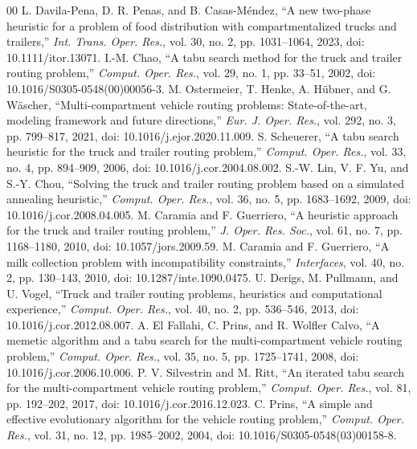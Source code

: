 \documentclass[conference]{IEEEtran}
\begin{document}
\begin{thebibliography}{00}
\setlength{\itemsep}{0pt}
 L. Davila-Pena, D. R. Penas, and B. Casas-M\'endez, ``A new two-phase heuristic for a problem of food distribution with compartmentalized trucks and trailers,'' \textit{Int. Trans. Oper. Res.}, vol. 30, no. 2, pp. 1031--1064, 2023, doi: 10.1111/itor.13071.
 I.-M. Chao, ``A tabu search method for the truck and trailer routing problem,'' \textit{Comput. Oper. Res.}, vol. 29, no. 1, pp. 33--51, 2002, doi: 10.1016/S0305-0548(00)00056-3.
 M. Ostermeier, T. Henke, A. H\"ubner, and G. W\"ascher, ``Multi-compartment vehicle routing problems: State-of-the-art, modeling framework and future directions,'' \textit{Eur. J. Oper. Res.}, vol. 292, no. 3, pp. 799--817, 2021, doi: 10.1016/j.ejor.2020.11.009.
 S. Scheuerer, ``A tabu search heuristic for the truck and trailer routing problem,'' \textit{Comput. Oper. Res.}, vol. 33, no. 4, pp. 894--909, 2006, doi: 10.1016/j.cor.2004.08.002.
 S.-W. Lin, V. F. Yu, and S.-Y. Chou, ``Solving the truck and trailer routing problem based on a simulated annealing heuristic,'' \textit{Comput. Oper. Res.}, vol. 36, no. 5, pp. 1683--1692, 2009, doi: 10.1016/j.cor.2008.04.005.
 M. Caramia and F. Guerriero, ``A heuristic approach for the truck and trailer routing problem,'' \textit{J. Oper. Res. Soc.}, vol. 61, no. 7, pp. 1168--1180, 2010, doi: 10.1057/jors.2009.59.
 M. Caramia and F. Guerriero, ``A milk collection problem with incompatibility constraints,'' \textit{Interfaces}, vol. 40, no. 2, pp. 130--143, 2010, doi: 10.1287/inte.1090.0475.
 U. Derigs, M. Pullmann, and U. Vogel, ``Truck and trailer routing problems, heuristics and computational experience,'' \textit{Comput. Oper. Res.}, vol. 40, no. 2, pp. 536--546, 2013, doi: 10.1016/j.cor.2012.08.007.
 A. El Fallahi, C. Prins, and R. Wolfler Calvo, ``A memetic algorithm and a tabu search for the multi-compartment vehicle routing problem,'' \textit{Comput. Oper. Res.}, vol. 35, no. 5, pp. 1725--1741, 2008, doi: 10.1016/j.cor.2006.10.006.
 P. V. Silvestrin and M. Ritt, ``An iterated tabu search for the multi-compartment vehicle routing problem,'' \textit{Comput. Oper. Res.}, vol. 81, pp. 192--202, 2017, doi: 10.1016/j.cor.2016.12.023.
 C. Prins, ``A simple and effective evolutionary algorithm for the vehicle routing problem,'' \textit{Comput. Oper. Res.}, vol. 31, no. 12, pp. 1985--2002, 2004, doi: 10.1016/S0305-0548(03)00158-8.

\end{thebibliography}
\end{document}
